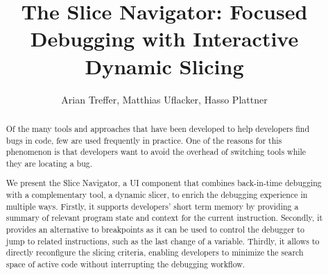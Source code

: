 \documentclass[
			english,
			review,
			]{elsarticle}
\begin{document}
\begin{frontmatter}

\title{The Slice Navigator: Focused Debugging with Interactive Dynamic Slicing}

\author{Arian Treffer, Matthias Uflacker, Hasso Plattner}
\address{Hasso Plattner Institute, Potsdam, Germany}


\begin{abstract}
%
%
Of the many tools and approaches that have been developed to help developers find bugs in code, few are used frequently in practice.
One of the reasons for this phenomenon is that developers want to avoid the overhead of switching tools while they are locating a bug.

We present the Slice Navigator, a UI component that combines back-in-time debugging with a complementary tool, a dynamic slicer, to enrich the debugging experience in multiple ways.
Firstly, it supports developers' short term memory by providing a summary of relevant program state and context for the current instruction.
Secondly, it provides an alternative to breakpoints as it can be used to control the debugger to jump to related instructions, such as the last change of a variable.
Thirdly, it allows to directly reconfigure the slicing criteria, enabling developers to minimize the search space of active code without interrupting the debugging workflow.


\end{abstract}
\end{frontmatter}
\end{document}
